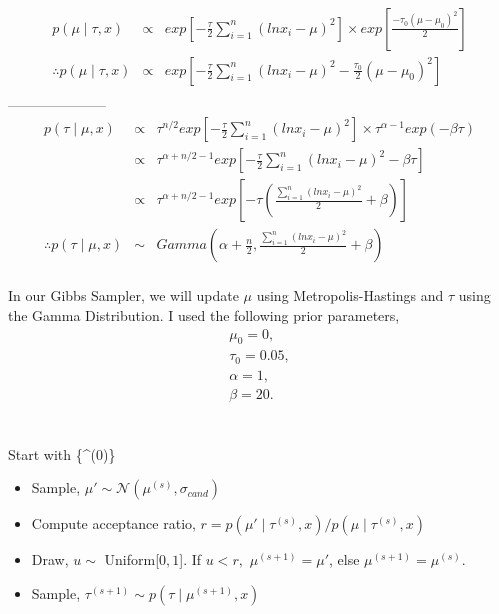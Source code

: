 \documentclass{article}
\begin{document}
\\
\begin{eqnarray*}
p(\mu \mid \tau,x) &\propto& exp\left[-\frac{\tau}{2}\sum_{i=1}^{n}{(ln x_i-\mu)^2}\right] \times exp\left[\frac{-\tau_0(\mu-\mu_0)^2}{2}\right]\\
\therefore p(\mu \mid \tau,x) &\propto& exp\left[-\frac{\tau}{2}\sum_{i=1}^{n}{(ln x_i-\mu)^2} - \frac{\tau_0}{2}(\mu-\mu_0)^2\right]\\
\end{eqnarray*}
---------------------\\
\begin{eqnarray*}
p(\tau \mid \mu,x) &\propto& \tau^{n/2}exp\left[-\frac{\tau}{2}\sum_{i=1}^{n}{(ln x_i-\mu)^2}\right] \times \tau^{\alpha-1}exp(-\beta\tau)\\
&\propto& \tau^{\alpha + n/2 -1 }exp\left[-\frac{\tau}{2}\sum_{i=1}^{n}{(ln x_i-\mu)^2}-\beta\tau\right]\\
&\propto& \tau^{\alpha + n/2 -1 }exp\left[-\tau\left(\frac{\sum_{i=1}^{n}{(ln x_i-\mu)^2}}{2}+\beta\right)\right]\\
\therefore p(\tau \mid \mu,x) &\sim& Gamma\left(\alpha + \frac{n}{2},\frac{\sum_{i=1}^{n}{(ln x_i-\mu)^2}}{2}+\beta\right)\\
\end{eqnarray*}

In our Gibbs Sampler, we will update $\mu$ using Metropolis-Hastings and $\tau$ using the Gamma Distribution. I used the following prior parameters,\\
\begin{eqnarray*}
\mu_0 = 0,\\
\tau_0 = 0.05,\\
\alpha = 1,\\
\beta = 20.\\
\end{eqnarray*}

\\

Start with \{\mu^{(0)}\}\\

\begin{itemize}
\item Sample, $\mu' \sim \mathcal{N}(\mu^{(s)},\sigma_{cand})$\\
\item Compute acceptance ratio, $r = p(\mu' \mid \tau^{(s)},x)/p(\mu \mid \tau^{(s)},x)$\\
\item Draw, $u \sim$ Uniform[$0,1$]. If $u < r,$ $\mu^{(s+1)} = \mu'$, else $\mu^{(s+1)} = \mu^{(s)}$.\\
\item Sample, $\tau^{(s+1)} \sim p(\tau \mid \mu^{(s+1)},x)$\\
\end{itemize}
\end{document}
